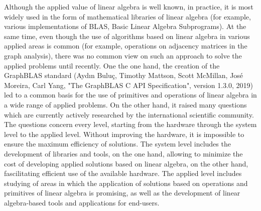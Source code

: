 \documentclass[12pt]{article}  %
\theoremstyle{remark}
\begin{document}
Although the applied value of linear algebra is well known, in practice, it is most widely used in the form of mathematical libraries of linear algebra (for example, various implementations of BLAS, Basic Linear Algebra Subprograms). At the same time, even though the use of algorithms based on linear algebra in various applied areas is common (for example, operations on adjacency matrices in the graph analysis), there was no common view on such an approach to solve the applied problems until recently. One the one hand, the creation of the GraphBLAS standard (Aydın Bulu\c{c}, Timothy Mattson, Scott McMillan, Jos\'{e} Moreira, Carl Yang, "The GraphBLAS C API Specification", version 1.3.0, 2019) led to a common basis for the use of primitives and operations of linear algebra in a wide range of applied problems. On the other hand, it raised many questions which are currently actively researched by the international scientific community. The questions concern every  level, starting from the hardware through the system level to the applied level. Without improving the hardware, it is impossible to ensure the maximum efficiency of solutions. The system level includes the development of libraries and tools, on the one hand, allowing to minimize the cost of developing applied solutions based on linear algebra, on the other hand, fascilitating efficient use of the available hardware. The applied level includes studying of areas in which the application of solutions based on operations and primitives of linear algebra is promising, as well as the development of linear algebra-based tools and applications for end-users.
\end{document}
